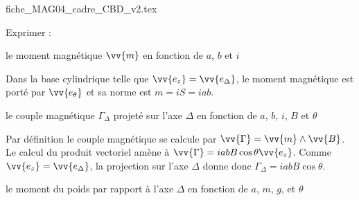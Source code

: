 \begin{center}
{fiche_MAG04_cadre_CBD_v2.tex}
\end{center}

                               \finalisationDuPartageDePage %


Exprimer : 

\begin{enonce}
le moment magnétique $\vv{m}$ en fonction de $a$, $b$ et $i$
\end{enonce}


\begin{corrige}
Dans la base cylindrique telle que $\vv{e_z}=\vv{e_\Delta}$, le moment magnétique est porté par $\vv{e_\theta}$ et sa norme est $m=iS=iab$.
\end{corrige}



\begin{enonce}
le couple magnétique $\Gamma_\Delta$ projeté sur l'axe $\Delta$ en fonction de $a$, $b$, $i$, $B$ et $\theta$
\end{enonce}


\begin{corrige}
Par définition le couple magnétique se calcule par $\vv{\Gamma}=\vv{m}\land\vv{B}$. Le calcul du produit vectoriel amène à $\vv{\Gamma}=iabB\cos\theta\vv{e_z}$. Comme $\vv{e_z}=\vv{e_\Delta}$, la projection sur l'axe $\Delta$ donne donc $\Gamma_\Delta=iabB\cos\theta$.
\end{corrige}




\begin{enonce}
le moment du poids par rapport à l'axe $\Delta$ en fonction de $a$, $m$, $g$, et $\theta$
\end{enonce}

